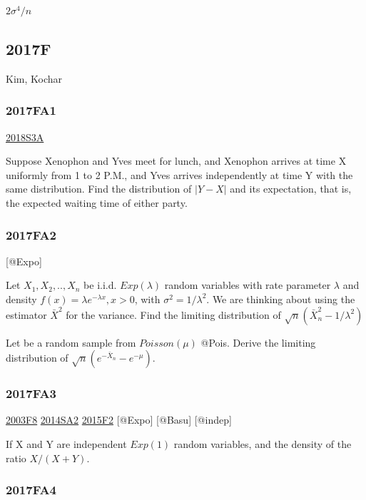 \documentclass[6pt,twocolumn,Portrait]{article}
\begin{document}
\(2\sigma^4/n\)

\hypertarget{f-12}{%
\subsection{2017F}\label{f-12}}

Kim, Kochar

\hypertarget{fa1-3}{%
\subsubsection{2017FA1}\label{fa1-3}}

\protect\hyperlink{s3a-2}{2018S3A}

Suppose Xenophon and Yves meet for lunch, and Xenophon arrives at time X
uniformly from 1 to 2 P.M., and Yves arrives independently at time Y
with the same distribution. Find the distribution of \(|Y-X|\) and its
expectation, that is, the expected waiting time of either party.

\hypertarget{fa2-3}{%
\subsubsection{2017FA2}\label{fa2-3}}

{[}@Expo{]}

Let \(X_1,X_2,..,X_n\) be i.i.d. \(Exp(\lambda)\) random variables with
rate parameter \(\lambda\) and density
\(f(x)=\lambda e^{-\lambda x}, x>0\), with \(\sigma^2=1/\lambda^2\). We
are thinking about using the estimator \(\bar X^2\) for the variance.
Find the limiting distribution of \(\sqrt{n}(\bar X_n^2-1/\lambda^2)\)

Let be a random sample from \(Poisson(\mu)\) @Pois. Derive the limiting
distribution of \(\sqrt{n}(e^{-\bar X_n}-e^{-\mu})\).

\hypertarget{fa3-3}{%
\subsubsection{2017FA3}\label{fa3-3}}

\protect\hyperlink{f8-1}{2003F8} \protect\hyperlink{sa2-2}{2014SA2}
\protect\hyperlink{f2-5}{2015F2} {[}@Expo{]} {[}@Basu{]} {[}@indep{]}

If X and Y are independent \(Exp(1)\) random variables, and the density
of the ratio \(X/(X+Y)\).

\hypertarget{fa4-3}{%
\subsubsection{2017FA4}\label{fa4-3}}
\end{document}
